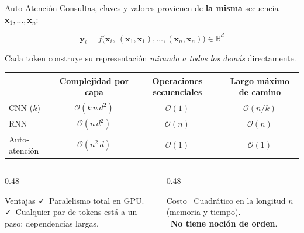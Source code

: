 \documentclass[aspectratio=169, 10pt]{beamer}
\providecommand{\R}{\mathbb{R}}
\newcommand{\good}{{\color{AccentGreen}\faCheck}}
\newcommand{\bad}{{\color{StanfordRed}\faTimes}}
\newcommand{\formula}[1]{%
	\begin{tcolorbox}[colback=UCMBlue!8, colframe=UCMBlue, arc=4pt,
		boxsep=2pt, left=6pt, right=6pt, top=3pt, bottom=3pt]
		#1
	\end{tcolorbox}
}
\begin{document}
\begin{frame}{Auto-Atenci\'on}
	Consultas, claves y valores provienen de \textbf{la misma} secuencia $\mathbf{x}_1,\dots,\mathbf{x}_n$:
	\formula{
		\[
		\mathbf{y}_i=f\big(\mathbf{x}_i,\ (\mathbf{x}_1,\mathbf{x}_1),\dots,(\mathbf{x}_n,\mathbf{x}_n)\big)\in\R^d
		\]
	}
	Cada token construye su representaci\'on \emph{mirando a todos los dem\'as} directamente.
	\begin{center}
		\small
		\begin{tabular}{lccc}
			\toprule
			& Complejidad por capa & Operaciones secuenciales & Largo m\'aximo de camino\\
			\midrule
			CNN ($k$) & $\mathcal{O}(k\,n\,d^2)$ & $\mathcal{O}(1)$ & $\mathcal{O}(n/k)$\\
			RNN & $\mathcal{O}(n\,d^2)$ & $\mathcal{O}(n)$ & $\mathcal{O}(n)$\\
			Auto-atenci\'on & $\mathcal{O}(n^2\,d)$ & $\mathcal{O}(1)$ & $\mathcal{O}(1)$\\
			\bottomrule
		\end{tabular}
	\end{center}
	\begin{columns}[T]
		\begin{column}{0.48\textwidth}
			\begin{block}{Ventajas}
				\small
				\good\ Paralelismo total en GPU.\\
				\good\ Cualquier par de tokens est\'a a un paso: dependencias largas.
			\end{block}
		\end{column}
		\begin{column}{0.48\textwidth}
			\begin{alertblock}{Costo}
				\small
				\bad\ Cuadr\'atico en la longitud $n$ (memoria y tiempo).\\
				\bad\ \textbf{No tiene noci\'on de orden}.
			\end{alertblock}
		\end{column}
	\end{columns}
\end{frame}
\end{document}
